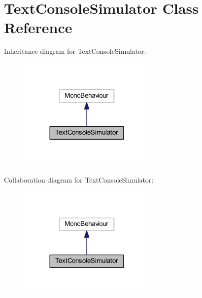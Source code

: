\hypertarget{class_text_console_simulator}{}\section{Text\+Console\+Simulator Class Reference}
\label{class_text_console_simulator}


Inheritance diagram for Text\+Console\+Simulator\+:
\nopagebreak
\begin{figure}[H]
\begin{center}
\leavevmode
\includegraphics[width=192pt]{class_text_console_simulator__inherit__graph}
\end{center}
\end{figure}


Collaboration diagram for Text\+Console\+Simulator\+:
\nopagebreak
\begin{figure}[H]
\begin{center}
\leavevmode
\includegraphics[width=192pt]{class_text_console_simulator__coll__graph}
\end{center}
\end{figure}
